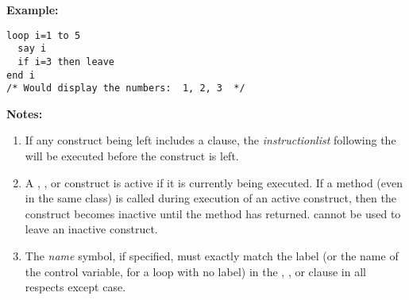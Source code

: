 \textbf{Example:}
\begin{lstlisting}
loop i=1 to 5
  say i
  if i=3 then leave
end i
/* Would display the numbers:  1, 2, 3  */
\end{lstlisting}
 \textbf{Notes:}
\begin{enumerate}
\item If any construct being left includes a  clause, the
\emph{instructionlist} following the  will be
executed before the construct is left.
\item 
A , , or  construct
is active if it is currently being executed.
If a method (even in the same class) is called during execution of an
active construct, then the construct becomes inactive until the method
has returned.
 cannot be used to leave an inactive construct.
\item The \emph{name} symbol, if specified, must exactly match the
label (or the name of the control variable, for a loop with no label) in
the , , or  clause in all
respects except case.
\end{enumerate}
